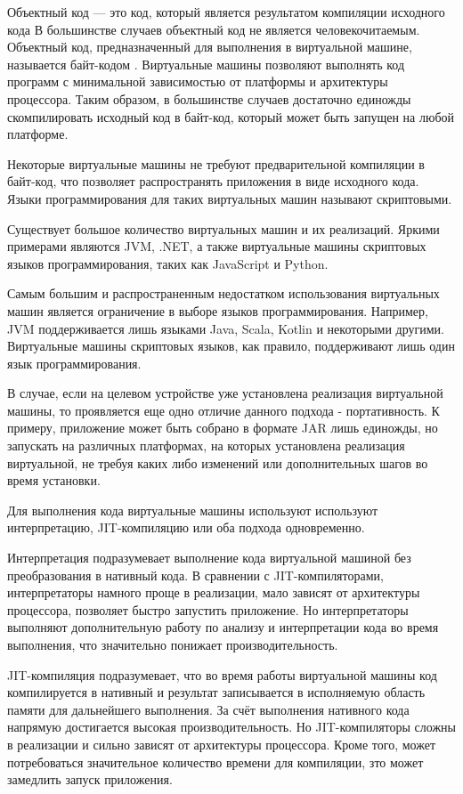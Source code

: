 Объектный код — это код, который является результатом компиляции исходного кода
В большинстве случаев объектный код не является человекочитаемым.
Объектный код, предназначенный для выполнения в виртуальной машине, называется байт-кодом \cite{BytecodeDefentition}.
Виртуальные машины позволяют выполнять код программ с минимальной зависимостью от платформы и архитектуры процессора.
Таким образом, в большинстве случаев достаточно единожды скомпилировать исходный код в байт-код, который может быть запущен на любой платформе.

Некоторые виртуальные машины не требуют предварительной компиляции в байт-код, что позволяет распространять приложения в виде исходного кода.
Языки программирования для таких виртуальных машин называют скриптовыми.

Существует большое количество виртуальных машин и их реализаций.
Яркими примерами являются JVM, .NET, а также виртуальные машины скриптовых языков программирования, таких как JavaScript и Python.

Самым большим и распространенным недостатком использования виртуальных машин является ограничение в выборе языков программирования. 
Например, JVM поддерживается лишь языками Java, Scala, Kotlin и некоторыми другими. 
Виртуальные машины скриптовых языков, как правило, поддерживают лишь один язык программирования.

В случае, если на целевом устройстве уже установлена реализация виртуальной машины, то проявляется еще одно отличие данного подхода - портативность. 
К примеру, приложение может быть собрано в формате JAR лишь единожды, но запускать на различных платформах, на которых установлена реализация виртуальной, не требуя каких либо изменений или дополнительных шагов во время установки.

Для выполнения кода виртуальные машины используют используют интерпретацию, JIT-компиляцию или оба подхода одновременно.

Интерпретация подразумевает выполнение кода виртуальной машиной без преобразования в нативный кода. 
В сравнении с JIT-компиляторами, интерпретаторы намного проще в реализации, мало зависят от архитектуры процессора, позволяет быстро запустить приложение.
Но интерпретаторы выполняют дополнительную работу по анализу и интерпретации кода во время выполнения, что значительно понижает производительность.

JIT-компиляция подразумевает, что во время работы виртуальной машины код компилируется в нативный и результат записывается в исполняемую область памяти для дальнейшего выполнения.
За счёт выполнения нативного кода напрямую достигается высокая производительность.
Но JIT-компиляторы сложны в реализации и сильно зависят от архитектуры процессора.
Кроме того, может потребоваться значительное количество времени для компиляции, зто может замедлить запуск приложения.

